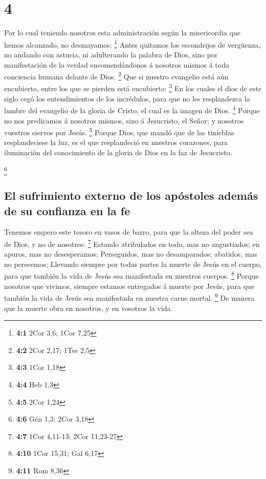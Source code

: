 \hypertarget{section-3}{%
\section{4}\label{section-3}}

 Por lo cual teniendo nosotros esta administración según
la misericordia que hemos alcanzado, no desmayamos; \footnote{\textbf{4:1}
  2Cor 3,6; 1Cor 7,25}  Antes quitamos los escondrijos de
vergüenza, no andando con astucia, ni adulterando la palabra de Dios,
sino por manifestación de la verdad encomendándonos á nosotros mismos á
toda conciencia humana delante de Dios. \footnote{\textbf{4:2} 2Cor
  2,17; 1Tes 2,5}  Que si nuestro evangelio está aún
encubierto, entre los que se pierden está encubierto: \footnote{\textbf{4:3}
  1Cor 1,18}  En los cuales el dios de este siglo cegó los
entendimientos de los incrédulos, para que no les resplandezca la lumbre
del evangelio de la gloria de Cristo, el cual es la imagen de Dios.
\footnote{\textbf{4:4} Heb 1,3}  Porque no nos predicamos
á nosotros mismos, sino á Jesucristo, el Señor; y nosotros vuestros
siervos por Jesús. \footnote{\textbf{4:5} 2Cor 1,24} 
Porque Dios, que mandó que de las tinieblas resplandeciese la luz, es el
que resplandeció en nuestros corazones, para iluminación del
conocimiento de la gloria de Dios en la faz de Jesucristo.

\footnote{\textbf{4:6} Gén 1,3; 2Cor 3,18}

\hypertarget{el-sufrimiento-externo-de-los-apuxf3stoles-ademuxe1s-de-su-confianza-en-la-fe}{%
\subsection{El sufrimiento externo de los apóstoles además de su
confianza en la
fe}\label{el-sufrimiento-externo-de-los-apuxf3stoles-ademuxe1s-de-su-confianza-en-la-fe}}

 Tenemos empero este tesoro en vasos de barro, para que la
alteza del poder sea de Dios, y no de nosotros: \footnote{\textbf{4:7}
  1Cor 4,11-13; 2Cor 11,23-27}  Estando atribulados en
todo, mas no angustiados; en apuros, mas no desesperamos; 
Perseguidos, mas no desamparados; abatidos, mas no perecemos;
 Llevando siempre por todas partes la muerte de Jesús en
el cuerpo, para que también la vida de Jesús sea manifestada en nuestros
cuerpos. \footnote{\textbf{4:10} 1Cor 15,31; Gal 6,17} 
Porque nosotros que vivimos, siempre estamos entregados á muerte por
Jesús, para que también la vida de Jesús sea manifestada en nuestra
carne mortal. \footnote{\textbf{4:11} Rom 8,36}  De
manera que la muerte obra en nosotros, y en vosotros la vida.

